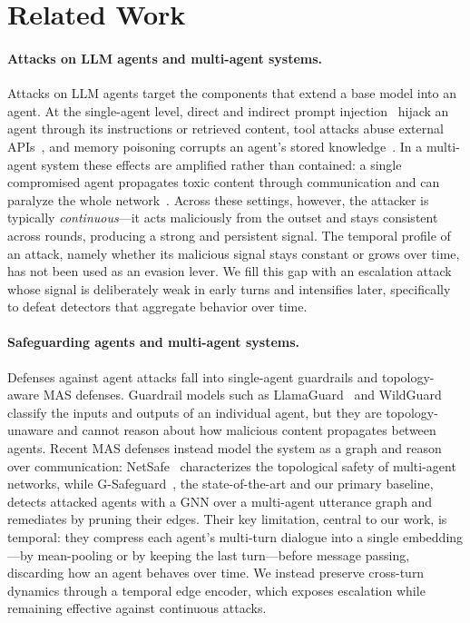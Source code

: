 \section{Related Work}
\label{sec:related_work}

\paragraph{Attacks on LLM agents and multi-agent systems.}
Attacks on LLM agents target the components that extend a base model into an
agent. At the single-agent level, direct and indirect prompt
injection~\citep{perez2022ignore,greshake2023indirect} hijack an agent through its
instructions or retrieved content, tool attacks abuse external
APIs~\citep{zhan2024injecagent}, and memory poisoning corrupts an agent's stored
knowledge~\citep{chen2024agentpoison}. In a multi-agent system these effects are
amplified rather than contained: a single compromised agent propagates toxic
content through communication and can paralyze the whole
network~\citep{gu2024agentsmith,yu2024netsafe,andriushchenko2024agentharm}.
Across these settings, however, the attacker is typically \emph{continuous}---it
acts maliciously from the outset and stays consistent across rounds, producing a
strong and persistent signal. The temporal profile of an attack, namely whether
its malicious signal stays constant or grows over time, has not been used as an
evasion lever. We fill this gap with an escalation attack whose signal is
deliberately weak in early turns and intensifies later, specifically to defeat
detectors that aggregate behavior over time.

\paragraph{Safeguarding agents and multi-agent systems.}
Defenses against agent attacks fall into single-agent guardrails and
topology-aware MAS defenses. Guardrail models such as
LlamaGuard~\citep{inan2023llamaguard} and WildGuard~\citep{han2024wildguard}
classify the inputs and outputs of an individual agent, but they are
topology-unaware and cannot reason about how malicious content propagates between
agents. Recent MAS defenses instead model the system as a graph and reason over
communication: NetSafe~\citep{yu2024netsafe} characterizes the topological safety
of multi-agent networks, while G-Safeguard~\citep{wang2025gsafeguard}, the
state-of-the-art and our primary baseline, detects attacked agents with a GNN over
a multi-agent utterance graph and remediates by pruning their edges. Their key
limitation, central to our work, is temporal: they compress each agent's
multi-turn dialogue into a single embedding---by mean-pooling or by keeping the
last turn---before message passing, discarding how an agent behaves over time. We
instead preserve cross-turn dynamics through a temporal edge encoder, which
exposes escalation while remaining effective against continuous attacks.

